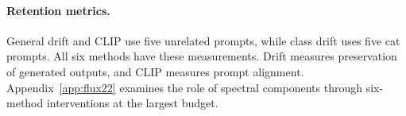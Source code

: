 \paragraph{Retention metrics.}
General drift and CLIP use five unrelated prompts, while class drift uses five cat prompts. All six methods have these measurements. Drift measures preservation of generated outputs, and CLIP measures prompt alignment. Appendix~\ref{app:flux22} examines the role of spectral components through six-method interventions at the largest budget.
